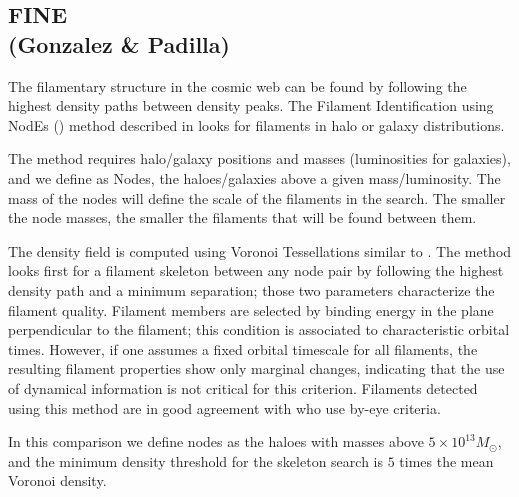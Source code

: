 \subsection{FINE \\ \hskip 0.75cm(Gonzalez \& Padilla)}
\label{section:gonzalez}

The filamentary structure in the cosmic web can be found by following the highest density paths between density peaks.
The Filament Identification using NodEs (\fine) method described in \citet{gonzalez2010} looks for filaments in halo or galaxy distributions.

The method requires halo/galaxy positions and masses (luminosities for galaxies), and we define as Nodes, the haloes/galaxies above a given mass/luminosity.
The mass of the nodes will define the scale of the filaments in the search. The smaller the node masses, the smaller the filaments that will be found between them.

The density field is computed using Voronoi Tessellations similar to \citet{schaapwey2000}.
The method looks first for a filament skeleton between any node pair by following the highest density path and a minimum separation; those two parameters characterize the filament quality.
Filament members are selected by binding energy in the plane perpendicular to the filament; this condition is associated to characteristic orbital times. However, if one assumes a fixed orbital timescale for all filaments, the resulting filament properties show only marginal changes, indicating that the use of dynamical information is not critical for this criterion.
Filaments detected using this method are in good agreement with \citet{colberg2005} who use  by-eye criteria.


In this comparison we define nodes as the haloes with masses above $5\times10^{13}M_{\odot}$, and the minimum density threshold for the skeleton search is $5$ times the mean Voronoi density.



